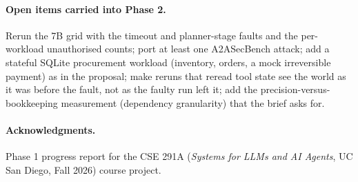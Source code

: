 \documentclass[10pt,twocolumn,letterpaper]{article}
\begin{document}
\paragraph{Open items carried into Phase 2.} Rerun the 7B grid with the timeout
and planner-stage faults and the per-workload unauthorised counts; port at
least one A2ASecBench attack; add a stateful SQLite procurement workload
(inventory, orders, a mock irreversible payment) as in the proposal;
make reruns that reread tool state see the world as it was before the fault,
not as the faulty run left it; add the precision-versus-bookkeeping
measurement (dependency granularity) that the brief asks for.

\paragraph{Acknowledgments.} Phase 1 progress report for the CSE 291A
(\emph{Systems for LLMs and AI Agents}, UC San Diego, Fall 2026) course project.
\end{document}
